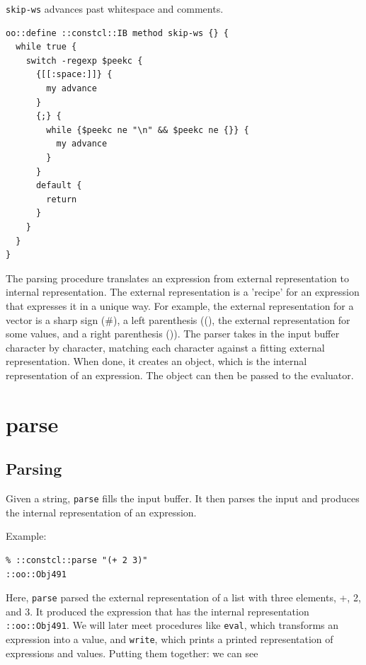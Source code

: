 \documentclass[twoside,9pt]{report}
\begin{document}
\texttt{skip-ws} advances past whitespace and comments.

\noindent\makebox[\linewidth]{\rule{\linewidth}{0.4pt}}
\begin{lstlisting}
oo::define ::constcl::IB method skip-ws {} {
  while true {
    switch -regexp $peekc {
      {[[:space:]]} {
        my advance
      }
      {;} {
        while {$peekc ne "\n" && $peekc ne {}} {
          my advance
        }
      }
      default {
        return
      }
    }
  }
}
\end{lstlisting}
\noindent\makebox[\linewidth]{\rule{\linewidth}{0.4pt}}

The parsing procedure translates an expression from external representation to internal representation. The external representation is a 'recipe' for an expression that expresses it in a unique way. For example, the external representation for a vector is a sharp sign (\#), a left parenthesis ((), the external representation for some values, and a right parenthesis ()). The parser takes in the input buffer character by character, matching each character against a fitting external representation. When done, it creates an object, which is the internal representation of an expression. The object can then be passed to the evaluator.

\section{parse}
\label{parse}
\subsection{Parsing}
\label{parsing}

Given a string, \texttt{parse} fills the input buffer. It then parses the input and produces the internal representation of an expression.


Example:

\noindent\makebox[\linewidth]{\rule{\linewidth}{0.4pt}}
\begin{lstlisting}
% ::constcl::parse "(+ 2 3)"
::oo::Obj491
\end{lstlisting}
\noindent\makebox[\linewidth]{\rule{\linewidth}{0.4pt}}

Here, \texttt{parse} parsed the external representation of a list with three elements, +, 2, and 3. It produced the expression that has the internal representation \texttt{::oo::Obj491}. We will later meet procedures like \texttt{eval}, which transforms an expression into a value, and \texttt{write}, which prints a printed representation of expressions and values. Putting them together: we can see
\end{document}
